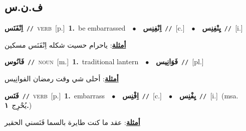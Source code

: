 \documentclass[10pt,a4paper,twoside]{article} %
\begin{document}
\begin{multicols}{2}
\vspace{-3mm}
\subsection*{\color{blue}\foreignlanguage{arabic}{ف.ن.س}\color{blue}{}} 

{\setlength\topsep{0pt}\textbf{\foreignlanguage{arabic}{اِنْفَنَس}}\ {\color{gray}\texttt{//}\color{black}}\ \textsc{verb}\ [p.]\ \textbf{1.}~be embarrassed\ \ $\bullet$\ \ \setlength\topsep{0pt}\textbf{\foreignlanguage{arabic}{اِنْفِنِس}}\ {\color{gray}\texttt{//}\color{black}}\ [c.]\ \ $\bullet$\ \ \setlength\topsep{0pt}\textbf{\foreignlanguage{arabic}{يِنْفِنِس}}\ {\color{gray}\texttt{//}\color{black}}\ [i.]\  \begin{flushright}\color{gray}\foreignlanguage{arabic}{\textbf{\underline{\foreignlanguage{arabic}{أمثلة}}}: ياحرام حسيت شكله اِنْفَنَس مسكين}\end{flushright}\color{black}} \vspace{2mm}

{\setlength\topsep{0pt}\textbf{\foreignlanguage{arabic}{فَانُوس}}\ {\color{gray}\texttt{//}\color{black}}\ \textsc{noun}\ [m.]\ \textbf{1.}~traditional lantern\ \ $\bullet$\ \ \setlength\topsep{0pt}\textbf{\foreignlanguage{arabic}{فَوَانِيس}}\ {\color{gray}\texttt{//}\color{black}}\ [pl.]\  \begin{flushright}\color{gray}\foreignlanguage{arabic}{\textbf{\underline{\foreignlanguage{arabic}{أمثلة}}}: أحلى شي وقت رمضان الفوانِيس}\end{flushright}\color{black}} \vspace{2mm}

{\setlength\topsep{0pt}\textbf{\foreignlanguage{arabic}{فَنَس}}\ {\color{gray}\texttt{//}\color{black}}\ \textsc{verb}\ [p.]\ \textbf{1.}~embarrass\ \ $\bullet$\ \ \setlength\topsep{0pt}\textbf{\foreignlanguage{arabic}{اِفْنِس}}\ {\color{gray}\texttt{//}\color{black}}\ [c.]\ \ $\bullet$\ \ \setlength\topsep{0pt}\textbf{\foreignlanguage{arabic}{يِفْنِس}}\ {\color{gray}\texttt{//}\color{black}}\ [i.]\ \color{gray}(msa. \foreignlanguage{arabic}{يُحْرِج}~\foreignlanguage{arabic}{\textbf{١.}})\color{black}\  \begin{flushright}\color{gray}\foreignlanguage{arabic}{\textbf{\underline{\foreignlanguage{arabic}{أمثلة}}}: عقد ما كنت طايرة بالسما فَنَسني الحقير}\end{flushright}\color{black}} \vspace{2mm}


\end{multicols}
\end{document}
